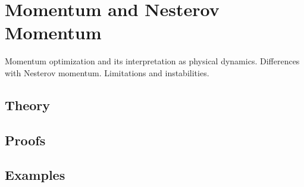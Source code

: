 
\section{Momentum and Nesterov Momentum}
\label{sec:2.5.01-momentum-nesterov}

\begin{ticket}
Momentum optimization and its interpretation as physical dynamics. Differences with Nesterov momentum. Limitations and instabilities.
\end{ticket}

\subsection*{Theory}

\subsection*{Proofs}

\subsection*{Examples}
